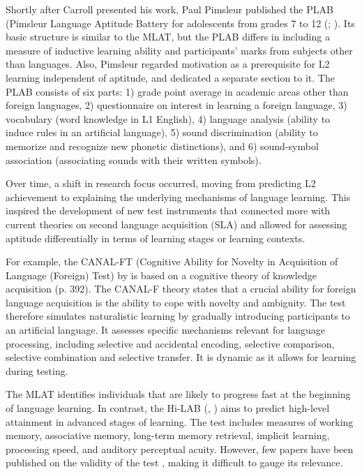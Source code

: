 \documentclass[output=paper]{langscibook}
\begin{document}
Shortly after Carroll presented his work, Paul Pimsleur published the PLAB (Pimsleur Language Aptitude Battery for adolescents from grades 7 to 12 (\citealt{Pimsleur1966}; \citealt{PimsleurQuinn1971}). Its basic structure is similar to the MLAT, but the PLAB differs in including a measure of inductive learning ability and participants’ marks from subjects other than languages. Also, Pimsleur regarded motivation as a prerequisite for L2 learning independent of aptitude, and dedicated a separate section to it. The PLAB consists of six parts: 1) grade point average in academic areas other than foreign languages, 2) questionnaire on interest in learning a foreign language, 3) vocabulary (word knowledge in L1 English), 4) language analysis (ability to induce rules in an artificial language), 5) sound discrimination (ability to memorize and recognize new phonetic distinctions), and 6) sound-symbol association (associating sounds with their written symbols).

Over time, a shift in research focus occurred, moving from predicting L2 achievement to explaining the underlying mechanisms of language learning. This inspired the development of new test instruments that connected more with current theories on second language acquisition (SLA) and allowed for assessing aptitude differentially in terms of learning stages or learning contexts. 

For example, the CANAL-FT (Cognitive Ability for Novelty in Acquisition of Language (Foreign) Test) by \citet{GrigorenkoEtAl2000} is based on a cognitive theory of knowledge acquisition (p. 392). The CANAL-F theory states that a crucial ability for foreign language acquisition is the ability to cope with novelty and ambiguity. The test therefore simulates naturalistic learning by gradually introducing participants to an artificial language. It assesses specific mechanisms relevant for language processing, including selective and accidental encoding, selective comparison, selective combination and selective transfer. It is dynamic as it allows for learning during testing. 

The MLAT identifies individuals that are likely to progress fast at the beginning of language learning. In contrast, the Hi-LAB (\citealt{DoughtyEtAl2010}, \citealt{LinckEtAl2013}) aims to predict high-level attainment in advanced stages of learning. The test includes measures of working memory, associative memory, long-term memory retrieval, implicit learning, processing speed, and auditory perceptual acuity. However, few papers have been published on the validity of the test \citep{LinckEtAl2013}, making it difficult to gauge its relevance. 
\end{document}
